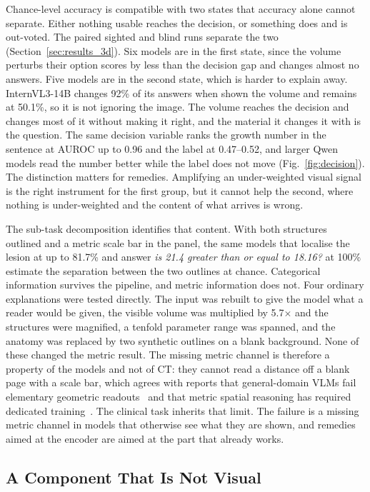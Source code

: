 Chance-level accuracy is compatible with two states that accuracy alone
cannot separate. Either nothing usable reaches the decision, or something
does and is out-voted. The paired sighted and blind runs separate the two
(Section~\ref{sec:results_3d}). Six models are in the first state, since
the volume perturbs their option scores by less than the decision gap and
changes almost no answers. Five models are in the second state, which is
harder to explain away. InternVL3-14B changes 92\% of its answers when shown
the volume and remains at 50.1\%, so it is not ignoring the image. The
volume reaches the decision and changes most of it without making it right,
and the material it changes it with is the question. The same decision
variable ranks the growth number in the sentence at AUROC up to 0.96 and the
label at 0.47--0.52, and larger Qwen models read the number better while the
label does not move (Fig.~\ref{fig:decision}). The distinction matters for
remedies. Amplifying an under-weighted visual signal is the right instrument
for the first group, but it cannot help the second, where nothing is
under-weighted and the content of what arrives is wrong.

The sub-task decomposition identifies that content. With both structures
outlined and a metric scale bar in the panel, the same models that localise
the lesion at up to 81.7\% and answer \emph{is 21.4 greater than or equal to
18.16?} at 100\% estimate the separation between the two outlines at chance.
Categorical information survives the pipeline, and metric information does
not. Four ordinary explanations were tested directly. The input was rebuilt
to give the model what a reader would be given, the visible volume was
multiplied by 5.7$\times$ and the structures were magnified, a tenfold
parameter range was spanned, and the anatomy was replaced by two synthetic
outlines on a blank background. None of these changed the metric result.
The missing metric channel is therefore a property of the models and not of
CT: they cannot read a distance off a blank page with a scale bar, which
agrees with reports that general-domain VLMs fail elementary geometric
readouts~\cite{rahmanzadehgervi2024blind,kamath2023whatsup} and that metric
spatial reasoning has required dedicated training~\cite{chen2024spatialvlm}.
The clinical task inherits that limit. The failure is a missing metric
channel in models that otherwise see what they are shown, and remedies aimed
at the encoder are aimed at the part that already works.

\subsection{A Component That Is Not Visual}

